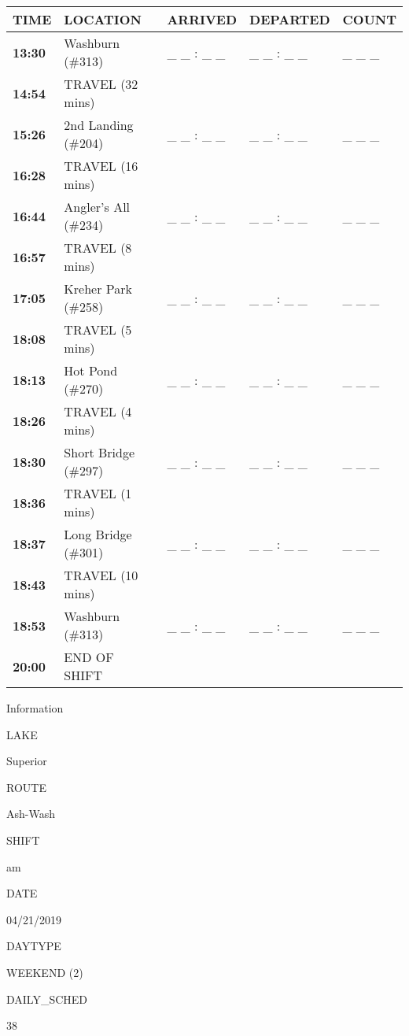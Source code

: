 \documentclass[]{article}
\begin{document}
\begin{tabular}{>{\bfseries}lllll}
\toprule
\textbf{TIME} & \textbf{LOCATION} & \textbf{ARRIVED} & \textbf{DEPARTED} & \textbf{COUNT}\\
\midrule
13:30 & Washburn (\#313) & \_ \_ : \_ \_ & \_ \_ : \_ \_ & \_ \_ \_\\
14:54 & TRAVEL (32 mins) &  &  & \\
15:26 & 2nd Landing (\#204) & \_ \_ : \_ \_ & \_ \_ : \_ \_ & \_ \_ \_\\
16:28 & TRAVEL (16 mins) &  &  & \\
16:44 & Angler's All (\#234) & \_ \_ : \_ \_ & \_ \_ : \_ \_ & \_ \_ \_\\
16:57 & TRAVEL (8 mins) &  &  & \\
17:05 & Kreher Park (\#258) & \_ \_ : \_ \_ & \_ \_ : \_ \_ & \_ \_ \_\\
18:08 & TRAVEL (5 mins) &  &  & \\
18:13 & Hot Pond (\#270) & \_ \_ : \_ \_ & \_ \_ : \_ \_ & \_ \_ \_\\
18:26 & TRAVEL (4 mins) &  &  & \\
18:30 & Short Bridge (\#297) & \_ \_ : \_ \_ & \_ \_ : \_ \_ & \_ \_ \_\\
18:36 & TRAVEL (1 mins) &  &  & \\
18:37 & Long Bridge (\#301) & \_ \_ : \_ \_ & \_ \_ : \_ \_ & \_ \_ \_\\
18:43 & TRAVEL (10 mins) &  &  & \\
18:53 & Washburn (\#313) & \_ \_ : \_ \_ & \_ \_ : \_ \_ & \_ \_ \_\\
20:00 & END OF SHIFT &  &  & \\
\bottomrule
\end{tabular}\newpage

Information

LAKE

Superior

ROUTE

Ash-Wash

SHIFT

am

DATE

04/21/2019

DAYTYPE

WEEKEND (2)

DAILY\_SCHED

38

\vspace{24pt}
\end{document}
